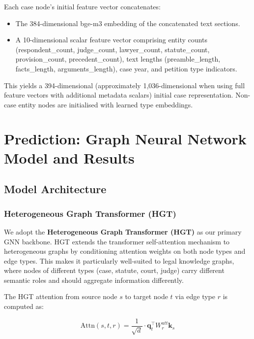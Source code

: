 \documentclass[12pt,a4paper]{report}
\begin{document}
Each case node's initial feature vector concatenates:
\begin{itemize}
  \item The 384-dimensional bge-m3 embedding of the concatenated text sections.
  \item A 10-dimensional scalar feature vector comprising entity counts (respondent\_count, judge\_count, lawyer\_count, statute\_count, provision\_count, precedent\_count), text lengths (preamble\_length, facts\_length, arguments\_length), case year, and petition type indicators.
\end{itemize}

This yields a 394-dimensional (approximately 1,036-dimensional when using full feature vectors with additional metadata scalars) initial case representation. Non-case entity nodes are initialised with learned type embeddings.

\chapter{Prediction: Graph Neural Network Model and Results}
\label{chap:prediction}

\section{Model Architecture}
\label{sec:model}

\subsection{Heterogeneous Graph Transformer (HGT)}

We adopt the \textbf{Heterogeneous Graph Transformer (HGT)} \citep{hu2020heterogeneous} as our primary GNN backbone. HGT extends the transformer self-attention mechanism to heterogeneous graphs by conditioning attention weights on both node types and edge types. This makes it particularly well-suited to legal knowledge graphs, where nodes of different types (case, statute, court, judge) carry different semantic roles and should aggregate information differently.

The HGT attention from source node $s$ to target node $t$ via edge type $r$ is computed as:

\begin{equation}
  \text{Attn}(s, t, r) = \frac{1}{\sqrt{d}} \cdot \mathbf{q}_t^\top W_r^{att} \mathbf{k}_s
\end{equation}
\end{document}
